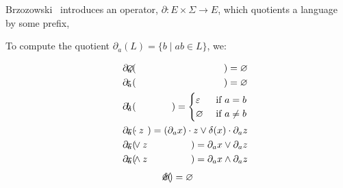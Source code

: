 \documentclass[sigplan,review,acmsmall,nonacm,screen,anonymous]{acmart}\settopmatter{printfolios=false,printccs=false,printacmref=false}
\begin{document}
\noindent Brzozowski~\cite{brzozowski1964derivatives} introduces an operator, $\partial: E \times \Sigma \rightarrow E$, which quotients a language by some prefix,

\begin{definition}[Brzozowski, 1964]
  To compute the quotient \(\partial_a(L) = \{b \mid ab \in L\}\), we:

  \vspace{-0.8cm}
  \begin{multicols}{2}
    \begin{eqnarray*}
      \phantom{--}\partial_a(&\hspace{-0.35cm} \varnothing \hspace{-0.35cm}&) = \varnothing                                           \\
      \phantom{--}\partial_a(&\hspace{-0.35cm} \varepsilon \hspace{-0.35cm}&) = \varnothing                                           \\
      \phantom{--}\partial_a(&\hspace{-0.35cm} b           \hspace{-0.35cm}&) = \begin{cases}\varepsilon &\text{ if } a = b\\ \varnothing &\text{ if } a \neq b \end{cases}\\
      \phantom{--}\partial_a(&\hspace{-0.35cm} x\cdot z    \hspace{-0.35cm}&) = (\partial_a x)\cdot z \vee \delta(x)\cdot\partial_a z \\
      \phantom{--}\partial_a(&\hspace{-0.35cm} x\vee  z    \hspace{-0.35cm}&) =  \partial_a x \vee  \partial_a z                       \\
      \phantom{--}\partial_a(&\hspace{-0.35cm} x\land z    \hspace{-0.35cm}&) =  \partial_a x \land \partial_a z
    \end{eqnarray*} \break\vspace{-0.45cm}
    \begin{eqnarray*}
      \delta(&\hspace{-0.35cm} \varnothing \hspace{-0.35cm}&) = \varnothing                                      \\

\end{eqnarray*}
\end{multicols}
\end{definition}
\end{document}

